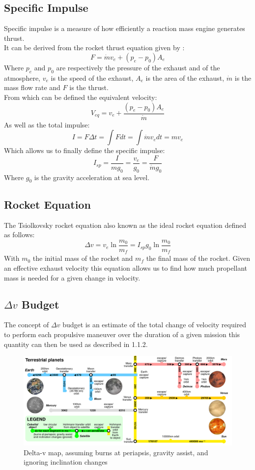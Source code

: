 \documentclass[12pt,a4paper]{report}
\begin{document}
\subsection{Specific Impulse}
Specific impulse is a measure of how efficiently a reaction mass engine generates thrust.\\
It can be derived from the rocket thrust equation given by :
\begin{equation}
F = \dot{m}v_e + (p_e - p_0)A_e 
\end{equation}
Where $p_e$ and $p_0$ are respectively the pressure of the exhaust and of the atmosphere, $v_e$ is the speed of the exhaust, $A_e$ is the area of the exhaust, $\dot{m}$ is the mass flow rate and $F$ is the thrust.\\
From which can be defined the equivalent velocity:
$$V_{eq}=v_e+\frac{(p_e-p_0)A_e}{\dot{m}}$$
As well as the total impulse:
$$I=F\Delta t = \int F dt = \int \dot{m}v_{e}dt=mv_{e}$$
Which allows us to finally define the specific impulse:
\begin{equation}
I_{sp}=\frac{I}{mg_0}=\frac{v_{e}}{g_0}=\frac{F}{\dot{m}g_0}
\end{equation}
Where $g_0$ is the gravity acceleration at sea level.
\newpage
\subsection{Rocket Equation}

The Tsiolkovsky rocket equation also known as the ideal rocket equation defined as follows: 
\begin{equation}
\Delta v=v_e\ln\frac{m_0}{m_f}=I_{sp}g_0\ln\frac{m_0}{m_f}
\end{equation}
With $m_0$ the initial mass of the rocket and $m_f$ the final mass of the rocket.
Given an effective exhaust velocity this equation allows us to find how much propellant mass is needed for a given change in velocity.
\subsection{$\Delta v$ Budget}
The concept of $\Delta v$ budget is an estimate of the total change of velocity required to perform each propulsive maneuver over the duration of a given mission this quantity can then be used as described in 1.1.2.\\
\begin{figure}[hbtp]
\centering
\includegraphics[scale=.2]{img/dv.png}
\caption{Delta-v map, assuming burns at periapsis, gravity assist, and ignoring inclination changes}
\end{figure}
\end{document}
